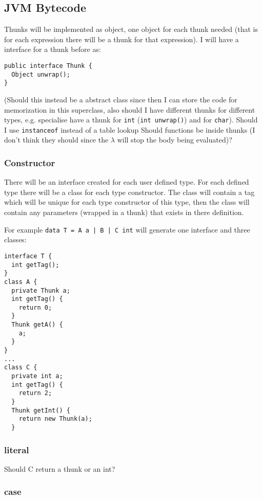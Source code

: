 \documentclass[12pt,a4paper,twoside]{article}
\begin{document}
\subsection{JVM Bytecode}

Thunks will be implemented as object, one object for each thunk needed (that is for each expression there will be a thunk for that expression).
I will have a interface for a thunk before as:

\begin{verbatim}
public interface Thunk {
  Object unwrap();
}
\end{verbatim}
(Should this instead be a abstract class since then I can store the code for memorization in this superclass, also should I have different thunks for different types,
e.g. specialise have a thunk for \texttt{int} (\texttt{int unwrap()}) and for \texttt{char}). Should I use \texttt{instanceof} instead of a table lookup
Should functions be inside thunks (I don't think they should since the $\lambda$ will stop the body being evaluated)?

\subsubsection{Constructor}

There will be an interface created for each user defined type. 
For each defined type there will be a class for each type constructor. The class will contain a tag which will be unique for each type constructor of this type,
then the class will contain any parameters (wrapped in a thunk) that exists in there definition.

For example \texttt{data T = A a | B | C int} will generate one interface and three classes:

\begin{verbatim}
interface T {
  int getTag();
}
class A {
  private Thunk a;
  int getTag() {
    return 0;
  }
  Thunk getA() {
    a;
  }
}
...
class C {
  private int a;
  int getTag() {
    return 2;
  }
  Thunk getInt() {
    return new Thunk(a);
  }
\end{verbatim}

\subsubsection{literal}
Should C return a thunk or an int? 

\subsubsection{case}
\end{document}
